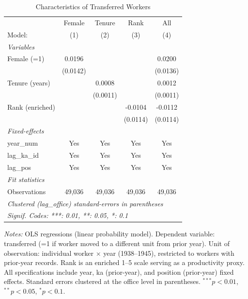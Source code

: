 \begin{table}[htbp]
\centering
\caption{Characteristics of Transferred Workers}
\label{tab:transferred_chars}
\begin{threeparttable}
\begin{tabular}{lcccc}
   \tabularnewline \midrule \midrule
                   & Female   & Tenure   & Rank     & All \\   
   Model:          & (1)      & (2)      & (3)      & (4)\\  
   \midrule
   \emph{Variables}\\
   Female (=1)     & 0.0196   &          &          & 0.0200\\   
                   & (0.0142) &          &          & (0.0136)\\   
   Tenure (years)  &          & 0.0008   &          & 0.0012\\   
                   &          & (0.0011) &          & (0.0011)\\   
   Rank (enriched) &          &          & -0.0104  & -0.0112\\   
                   &          &          & (0.0114) & (0.0114)\\   
   \midrule
   \emph{Fixed-effects}\\
   year\_num       & Yes      & Yes      & Yes      & Yes\\  
   lag\_ka\_id     & Yes      & Yes      & Yes      & Yes\\  
   lag\_pos        & Yes      & Yes      & Yes      & Yes\\  
   \midrule
   \emph{Fit statistics}\\
   Observations    & 49,036   & 49,036   & 49,036   & 49,036\\  
   \midrule \midrule
   \multicolumn{5}{l}{\emph{Clustered (lag\_office) standard-errors in parentheses}}\\
   \multicolumn{5}{l}{\emph{Signif. Codes: ***: 0.01, **: 0.05, *: 0.1}}\\
\end{tabular}
\begin{tablenotes}[flushleft]
\footnotesize
\item \textit{Notes:} OLS regressions (linear probability model). Dependent variable: transferred (=1 if worker moved to a different unit from prior year). Unit of observation: individual worker $\times$ year (1938--1945), restricted to workers with prior-year records. Rank is an enriched 1--5 scale serving as a productivity proxy. All specifications include year, ka (prior-year), and position (prior-year) fixed effects. Standard errors clustered at the office level in parentheses. $^{***}p<0.01$, $^{**}p<0.05$, $^{*}p<0.1$.
\end{tablenotes}
\end{threeparttable}
\end{table}
